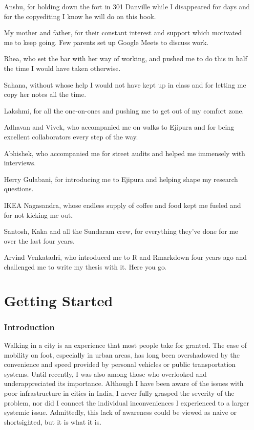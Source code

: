 \documentclass[
]{latex/krantz}
\begin{document}
Anshu, for holding down the fort in 301 Danville while I disappeared for days and for the copyediting I know he will do on this book.

My mother and father, for their constant interest and support which motivated me to keep going. Few parents set up Google Meets to discuss work.

Rhea, who set the bar with her way of working, and pushed me to do this in half the time I would have taken otherwise.

Sahana, without whose help I would not have kept up in class and for letting me copy her notes all the time.

Lakshmi, for all the one-on-ones and pushing me to get out of my comfort zone.

Adhavan and Vivek, who accompanied me on walks to Ejipura and for being excellent collaborators every step of the way.

Abhishek, who accompanied me for street audits and helped me immensely with interviews.

Herry Gulabani, for introducing me to Ejipura and helping shape my research questions.

IKEA Nagasandra, whose endless supply of coffee and food kept me fueled and for not kicking me out.

Santosh, Kaka and all the Sundaram crew, for everything they've done for me over the last four years.

Arvind Venkatadri, who introduced me to R and Rmarkdown four years ago and challenged me to write my thesis with it. Here you go.

\setlength{\abovedisplayskip}{-5pt}
\setlength{\abovedisplayshortskip}{-5pt}

{
\hypersetup{linkcolor=}
\setcounter{tocdepth}{3}
\tableofcontents
}
\hypertarget{part-getting-started}{%
\part{Getting Started}\label{part-getting-started}}

\hypertarget{intro}{%
\section{Introduction}\label{intro}}

Walking in a city is an experience that most people take for granted. The ease of mobility on foot, especially in urban areas, has long been overshadowed by the convenience and speed provided by personal vehicles or public transportation systems. Until recently, I was also among those who overlooked and underappreciated its importance. Although I have been aware of the issues with poor infrastructure in cities in India, I never fully grasped the severity of the problem, nor did I connect the individual inconveniences I experienced to a larger systemic issue. Admittedly, this lack of awareness could be viewed as naive or shortsighted, but it is what it is.
\end{document}

